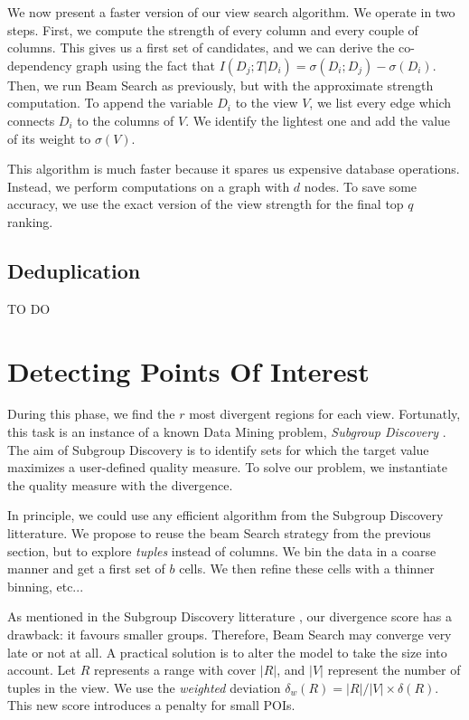 We now present a faster version of our view search algorithm.  We operate in
two steps. First, we compute the strength of every column and every couple of
columns.  This gives us a first set of candidates, and we can derive the
co-dependency graph using the fact that $I(D_{j} ; T | D_i) = \sigma(D_i ;
D_{j}) - \sigma(D_i)$.  Then, we run Beam Search as previously, but with the
approximate strength computation.  To append the variable $D_i$ to the view
$V$, we list every edge which connects  $D_i$ to the columns of $V$. We
identify the lightest one and add the value of its weight to $\sigma(V)$.  

This algorithm is much faster because it spares us expensive database
operations. Instead, we perform computations on a graph with $d$ nodes.  To
save some accuracy, we use the exact version of the view strength for the final
top $q$ ranking.

\subsection{Deduplication}

TO DO

\section{Detecting Points Of Interest}
\label{sec:detec}

During this phase, we find the $r$ most divergent regions for each view.
Fortunatly, this task is an instance of a known Data Mining problem,
\emph{Subgroup Discovery} \cite{klosgen1996explora}\cite{wrobel1997algorithm}.
The aim of Subgroup Discovery is to identify sets for which the target value
maximizes a user-defined quality measure. To solve our problem, we instantiate
the quality measure with the divergence.

In principle, we could use any efficient algorithm from the Subgroup Discovery
litterature.  We propose to reuse the beam Search strategy from the previous
section, but to explore \emph{tuples} instead of columns. We bin the data in a
coarse manner and get a first set of $b$ cells. We then refine these cells with
a thinner binning, etc...

As mentioned in the Subgroup Discovery litterature \cite{van2011non}, our
divergence score has a drawback: it favours smaller groups.  Therefore, Beam
Search may converge very late or not at all.  A practical
solution is to alter the model to take the size into account. Let $R$
represents a range with cover $|R|$, and $|V|$ represent the number of tuples
in the view. We use the \emph{weighted} deviation $\delta_w(R) = |R|/|V| \times
\delta(R)$. This new score introduces a penalty for small POIs.


